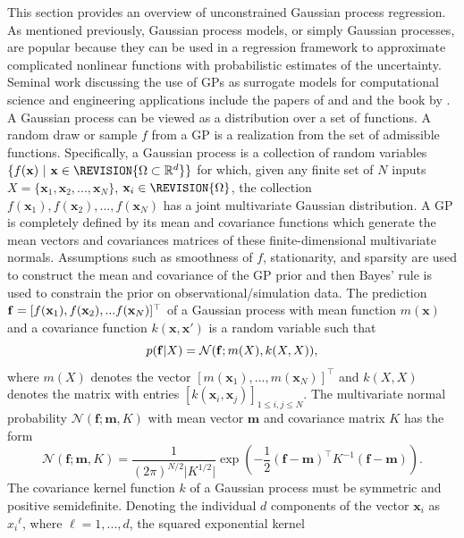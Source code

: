 \label{gpr}
\label{sec:gpr}
This section provides an overview of unconstrained Gaussian process regression. 
As mentioned previously, Gaussian process models, or simply Gaussian processes, are popular because they can be used in a regression framework to approximate 
complicated nonlinear functions with probabilistic estimates of the uncertainty. Seminal work discussing the use of GPs as surrogate models for computational science and engineering applications include the papers of  and  and the book by .
A Gaussian process can be viewed as a distribution over a set of functions.
A random draw or sample $f$ from a GP is a realization from the set of admissible functions. 
Specifically, a Gaussian process is a collection of random variables
$\{f(\mathbf{x}) \ | \ \mathbf{x} \in \REVISION{\Omega \subset \mathbb{R}^d} \}$ for which, given any finite set of $N$ inputs $X = \{\mathbf{x}_1, \mathbf{x}_2, ..., \mathbf{x}_N\}$, $\mathbf{x}_i \in \REVISION{\Omega}$, the collection $f(\mathbf{x}_1),f(\mathbf{x}_2),...,f(\mathbf{x}_N)$  
has a joint multivariate Gaussian distribution.  
A GP is completely defined by its mean and covariance functions which generate the mean vectors and covariances matrices of these finite-dimensional multivariate normals. Assumptions such as smoothness of $f$, stationarity, and sparsity are used to construct the mean and covariance of the GP prior and then Bayes' rule is used to constrain the prior on observational/simulation data.
The prediction 
$\mathbf{f}=[f(\bold{x}_1),f(\mathbf{x}_2),...f(\mathbf{x}_N)]^\top$ of a Gaussian process with mean function 
$m(\mathbf{x})$
and a covariance function $k(\mathbf{x},\mathbf{x}')$ is a random variable such that
\begin{equation}
p(\bold{f}|X) = \mathcal{N}(\mathbf{f}; m(X), k(X,X)),
\label{eq:multivar_norm}
\end{equation}
where $m(X)$ denotes the vector $[m(\mathbf{x}_1), ..., m(\mathbf{x}_N)]^\top$ and $k(X,X)$ denotes the matrix with entries $[k(\mathbf{x}_i,\mathbf{x}_j)]_{1 \le i,j \le N}$. 
The multivariate normal probability 
$\mathcal{N}(\mathbf{f}; \mathbf{m}, K)$ with mean vector $\mathbf{m}$ and covariance matrix $K$ has the form
\begin{equation}\label{standard_mvn}
\mathcal{N}(\mathbf{f}; \mathbf{m}, K) = \frac{1}{(2\pi)^{N/2}|{K^{1/2}|}}\exp\left({-\frac{1}{2}(\mathbf{f}-\mathbf{m})^\top K^{-1}(\mathbf{f}-\mathbf{m})}\right).
\end{equation}
The covariance kernel function $k$ of a Gaussian process must be symmetric and positive semidefinite. Denoting the individual $d$ components of the vector $\mathbf{x}_{i}$ as ${x_i}^\ell$, where $\ell=1,...,d$, the squared exponential kernel
